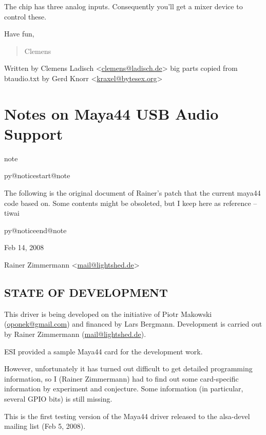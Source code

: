 \documentclass[a4paper,8pt,english]{sphinxmanual}
\makeatletter
\renewenvironment{notice}[2]{%
          \def\py@noticetype{#1}
          \begin{coloredbox}{#1}
          \bf\it
          \par\strong{#2}
          \csname py@noticestart@#1\endcsname
        }
	{
          \csname py@noticeend@\py@noticetype\endcsname
          \end{coloredbox}
        }
\makeatother
\begin{document}
The chip has three analog inputs.  Consequently you'll get a mixer
device to control these.

Have fun,
\begin{quote}

Clemens
\end{quote}

Written by Clemens Ladisch \textless{}\href{mailto:clemens@ladisch.de}{clemens@ladisch.de}\textgreater{}
big parts copied from btaudio.txt by Gerd Knorr \textless{}\href{mailto:kraxel@bytesex.org}{kraxel@bytesex.org}\textgreater{}


\section{Notes on Maya44 USB Audio Support}
\label{sound/cards/maya44:notes-on-maya44-usb-audio-support}\label{sound/cards/maya44::doc}
\begin{notice}{note}{Note:}
The following is the original document of Rainer's patch that the
current maya44 code based on.  Some contents might be obsoleted, but I
keep here as reference -- tiwai
\end{notice}

Feb 14, 2008

Rainer Zimmermann \textless{}\href{mailto:mail@lightshed.de}{mail@lightshed.de}\textgreater{}


\subsection{STATE OF DEVELOPMENT}
\label{sound/cards/maya44:state-of-development}
This driver is being developed on the initiative of Piotr Makowski (\href{mailto:oponek@gmail.com}{oponek@gmail.com}) and financed by Lars Bergmann.
Development is carried out by Rainer Zimmermann (\href{mailto:mail@lightshed.de}{mail@lightshed.de}).

ESI provided a sample Maya44 card for the development work.

However, unfortunately it has turned out difficult to get detailed programming information, so I (Rainer Zimmermann) had to find out some card-specific information by experiment and conjecture. Some information (in particular, several GPIO bits) is still missing.

This is the first testing version of the Maya44 driver released to the alsa-devel mailing list (Feb 5, 2008).
\end{document}
